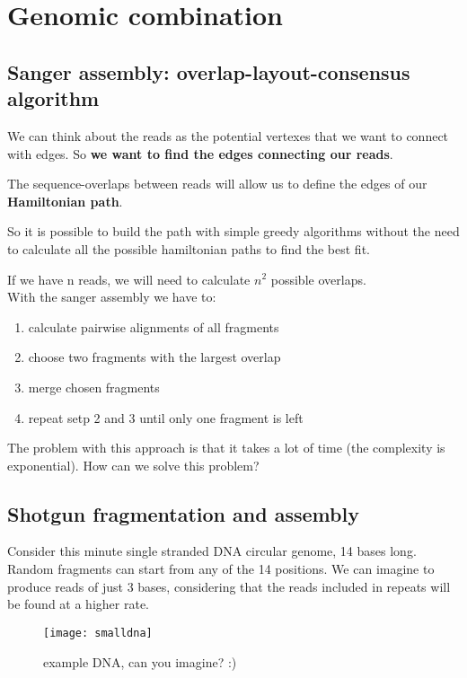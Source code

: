 \newpage
\section{Genomic combination}

\subsection{Sanger assembly: overlap-layout-consensus algorithm}

We can think about the reads as the potential vertexes that we 
want to connect with edges. 
So \textbf{we want to find the edges connecting our reads}.

The sequence-overlaps between reads will allow us to define the 
edges of our \textbf{Hamiltonian path}.
  
So it is possible to build the path with simple greedy algorithms
without the need to calculate all the possible hamiltonian paths to 
find the best fit.

If we have n reads, we will need to calculate $n^2$ possible overlaps.\\

With the sanger assembly we have to:
\begin{enumerate}
  \item calculate pairwise alignments of all fragments
  \item choose two fragments with the largest overlap
  \item merge chosen fragments
  \item repeat setp 2 and 3 until only one fragment is left
\end{enumerate}

The problem with this approach is that it takes a lot of time (the complexity
is exponential). How can we solve this problem?\\

\subsection{Shotgun fragmentation and assembly}

Consider this minute single stranded DNA circular genome, 14 bases long.
Random fragments can start from any of the 14 positions.
We can imagine to produce reads of just 3 bases, considering that the
reads included in repeats will be found at a higher rate.

\begin{figure}[H]
  \centering
  \texttt{[image: smalldna]}
  \caption{example DNA, can you imagine? :)}
  \label{fig:smalldna}
\end{figure}

